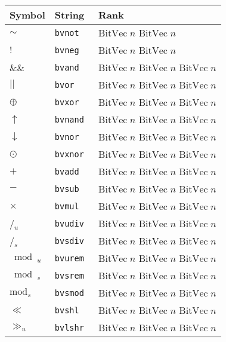 \begin{table}
\centering
\begin{tabular}{lll}
\toprule
\textbf{Symbol} & \textbf{String} & \textbf{Rank} \\
\midrule
$\sim$ & \tt{bvnot} & \(\mathrm{BitVec}\;n\)\; \(\mathrm{BitVec}\;n\) \\
$!$   & \tt{bvneg} & \(\mathrm{BitVec}\;n\)\; \(\mathrm{BitVec}\;n\) \\
$\&\&$ & \tt{bvand} & \(\mathrm{BitVec}\;n\)\; \(\mathrm{BitVec}\;n\)\; \(\mathrm{BitVec}\;n\) \\
$||$  & \tt{bvor}  & \(\mathrm{BitVec}\;n\)\; \(\mathrm{BitVec}\;n\)\; \(\mathrm{BitVec}\;n\) \\
$\oplus$& \tt{bvxor} & \(\mathrm{BitVec}\;n\)\; \(\mathrm{BitVec}\;n\)\; \(\mathrm{BitVec}\;n\) \\
$\uparrow$ & \tt{bvnand} & \(\mathrm{BitVec}\;n\)\; \(\mathrm{BitVec}\;n\)\; \(\mathrm{BitVec}\;n\) \\
$\downarrow$ & \tt{bvnor}  & \(\mathrm{BitVec}\;n\)\; \(\mathrm{BitVec}\;n\)\; \(\mathrm{BitVec}\;n\) \\
$\odot$ & \tt{bvxnor} & \(\mathrm{BitVec}\;n\)\; \(\mathrm{BitVec}\;n\)\; \(\mathrm{BitVec}\;n\) \\
$+$ & \tt{bvadd} & \(\mathrm{BitVec}\;n\)\; \(\mathrm{BitVec}\;n\)\; \(\mathrm{BitVec}\;n\) \\
$-$ & \tt{bvsub} & \(\mathrm{BitVec}\;n\)\; \(\mathrm{BitVec}\;n\)\; \(\mathrm{BitVec}\;n\) \\
$\times$ & \tt{bvmul} & \(\mathrm{BitVec}\;n\)\; \(\mathrm{BitVec}\;n\)\; \(\mathrm{BitVec}\;n\) \\
/\(_u\) & \tt{bvudiv} & \(\mathrm{BitVec}\;n\)\; \(\mathrm{BitVec}\;n\)\; \(\mathrm{BitVec}\;n\) \\
/\(_s\) & \tt{bvsdiv} & \(\mathrm{BitVec}\;n\)\; \(\mathrm{BitVec}\;n\)\; \(\mathrm{BitVec}\;n\) \\
$\bmod_u$ & \tt{bvurem} & \(\mathrm{BitVec}\;n\)\; \(\mathrm{BitVec}\;n\)\; \(\mathrm{BitVec}\;n\) \\
$\bmod_s$ & \tt{bvsrem} & \(\mathrm{BitVec}\;n\)\; \(\mathrm{BitVec}\;n\)\; \(\mathrm{BitVec}\;n\) \\
$\mathrm{mod}_s$ & \tt{bvsmod} & \(\mathrm{BitVec}\;n\)\; \(\mathrm{BitVec}\;n\)\; \(\mathrm{BitVec}\;n\) \\
$\ll$ & \tt{bvshl}  & \(\mathrm{BitVec}\;n\)\; \(\mathrm{BitVec}\;n\)\; \(\mathrm{BitVec}\;n\) \\
$\gg_u$ & \tt{bvlshr} & \(\mathrm{BitVec}\;n\)\; \(\mathrm{BitVec}\;n\)\; \(\mathrm{BitVec}\;n\) \\

\end{tabular}
\end{table}
